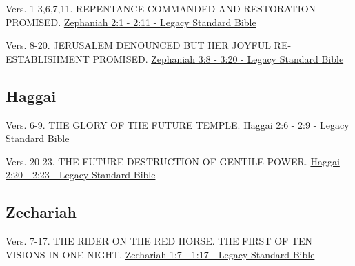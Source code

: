 \documentclass[
  ignorenonframetext,
]{beamer}
\begin{document}
\begin{frame}{2}
\label{section-131}
\begin{block}{Vers. 1-3,6,7,11. REPENTANCE COMMANDED AND RESTORATION
PROMISED.}
\label{vers.-1-36711.-repentance-commanded-and-restoration-promised.}
\href{https://read.lsbible.org/?q=zeph2\%3A1-11}{Zephaniah 2:1 - 2:11 -
Legacy Standard Bible}
\end{block}
\end{frame}

\begin{frame}{3}
\label{section-132}
\begin{block}{Vers. 8-20. JERUSALEM DENOUNCED BUT HER JOYFUL
RE-ESTABLISHMENT PROMISED.}
\label{vers.-8-20.-jerusalem-denounced-but-her-joyful-re-establishment-promised.}
\href{https://read.lsbible.org/?q=zeph3\%3A8-20}{Zephaniah 3:8 - 3:20 -
Legacy Standard Bible}
\end{block}
\end{frame}

\subsection{Haggai}\label{haggai}

\begin{frame}{2}
\label{section-133}
\begin{block}{Vers. 6-9. THE GLORY OF THE FUTURE TEMPLE.}
\label{vers.-6-9.-the-glory-of-the-future-temple.}
\href{https://read.lsbible.org/?q=hag2\%3A6-9}{Haggai 2:6 - 2:9 - Legacy
Standard Bible}
\end{block}

\begin{block}{Vers. 20-23. THE FUTURE DESTRUCTION OF GENTILE POWER.}
\label{vers.-20-23.-the-future-destruction-of-gentile-power.}
\href{https://read.lsbible.org/?q=hag2\%3A20-23}{Haggai 2:20 - 2:23 -
Legacy Standard Bible}
\end{block}
\end{frame}

\subsection{Zechariah}\label{zechariah}

\begin{frame}{1}
\label{section-134}
\begin{block}{Vers. 7-17. THE RIDER ON THE RED HORSE. THE FIRST OF TEN
VISIONS IN ONE NIGHT.}
\label{vers.-7-17.-the-rider-on-the-red-horse.-the-first-of-ten-visions-in-one-night.}
\href{https://read.lsbible.org/?q=zech1\%3A7-17}{Zechariah 1:7 - 1:17 -
Legacy Standard Bible}
\end{block}
\end{frame}
\end{document}
